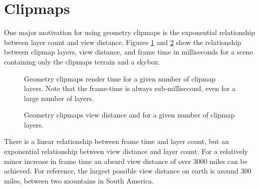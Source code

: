 \section{Clipmaps}

One major motivation for using geometry clipmaps is the exponential relationship between layer count and view distance.
Figures \ref{fig:clipmaps_plot_1} and \ref{fig:clipmaps_plot_2} show the relationship between clipmap layers, view distance, and frame time in milliseconds for a scene containing only the clipmaps terrain and a skybox.

\begin{figure}
	\centering
{}
	\caption{
		Geometry clipmaps render time for a given number of clipmap layers.
		Note that the frame-time is always sub-millisecond, even for a large number of layers.
	}
	\label{fig:clipmaps_plot_1}
\end{figure}

\begin{figure}
	\centering
{}
	\caption{
		Geometry clipmaps view distance and for a given number of clipmap layers.
	}
	\label{fig:clipmaps_plot_2}
\end{figure}

There is a linear relationship between frame time and layer count, but an exponential relationship between view distance and layer count.
For a relatively minor increase in frame time an absurd view distance of over 3000 miles can be achieved.
For reference, the largest possible view distance on earth is around 300 miles, between two mountains in South America. \cite{viewdistancemaxearth}

